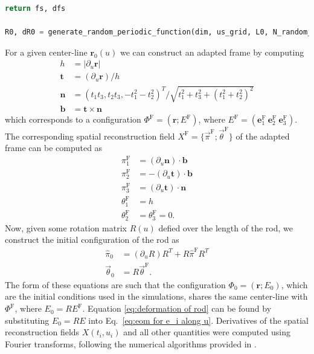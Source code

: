 \documentclass[withindex,glossary,techreport]{cam-thesis}
\begin{document}
\begin{appendices}
\begin{lstlisting}[language=Python, caption=Generating random stiffness matrices and moment of inertia., label={lst:random centerline}]
    return fs, dfs

R0, dR0 = generate_random_periodic_function(dim, us_grid, L0, N_random_curve_modes, mu_random_curve, sigma_random_curve)
\end{lstlisting}

For a given center-line $\mathbf{r}_0(u)$ we can construct an adapted frame by computing
\begin{subequations}
\begin{align}
	 h & = |\partial_u \mathbf{r}| \\
	\mathbf{t} & = (\partial_u \mathbf{r}) / h \\
	\mathbf{n} & = (t_1 t_3, t_2 t_3, -t_1^2 - t_2^2)^T / \sqrt{ t_1^2 + t_3^2 +(t_1^2 + t_2^2)^2 } \\
	\mathbf{b} & = \mathbf{t} \times \mathbf{n}
\end{align}
\end{subequations}
which corresponds to a configuration $\Phi^\text{F} = (\mathbf{r} ; E^\text{F})$, where $E^\text{F} = (\mathbf{e}_1^\text{F}\ \mathbf{e}_2^\text{F}\ \mathbf{e}_3^\text{F})$. The corresponding spatial reconstruction field $X^\text{F} = \{ \vec{\pi}^\text{F}; \vec{\theta}^\text{F} \}$ of the adapted frame can be computed as
\begin{subequations}
	\begin{align}
		\pi_1^\text{F} & = (\partial_u \mathbf{n}) \cdot \mathbf{b} \\
		\pi_2^\text{F} & = - (\partial_u \mathbf{t}) \cdot \mathbf{b} \\
		\pi_3^\text{F} & = (\partial_u \mathbf{t}) \cdot \mathbf{n} \\
		\theta_1^\text{F} & = h\\
		\theta_2^\text{F} & = \theta_3^\text{F} = 0.
	\end{align}
\end{subequations}
Now, given some rotation matrix $R(u)$ defied over the length of the rod, we construct the initial configuration of the rod as 
\begin{subequations} \label{eq:deformation of rod}
	\begin{align}
		\hat{\pi}_0 & = (\partial_u R) R^T + R \hat{\pi}^\text{F} R^T \\
		\vec{\theta}_0 & = R \vec{\theta}^\text{F}.
	\end{align}
\end{subequations}
The form of these equations are such that the configuration $\Phi_0 = (\mathbf{r} ; E_0)$, which are the initial conditions used in the simulations, shares the same center-line with $\Phi^\text{F}$, where $E_0 = R E^\text{F}$. Equation \ref{eq:deformation of rod} can be found by substituting $E_0 = R E$ into Eq.~\ref{eq:eom for e_i along u}. Derivatives of the spatial reconstruction fields $X(t_i, u_i)$ and all other quantities were computed using Fourier transforms, following the numerical algorithms provided in \citep{trefethen2000spectral}.


\end{appendices}
\end{document}

